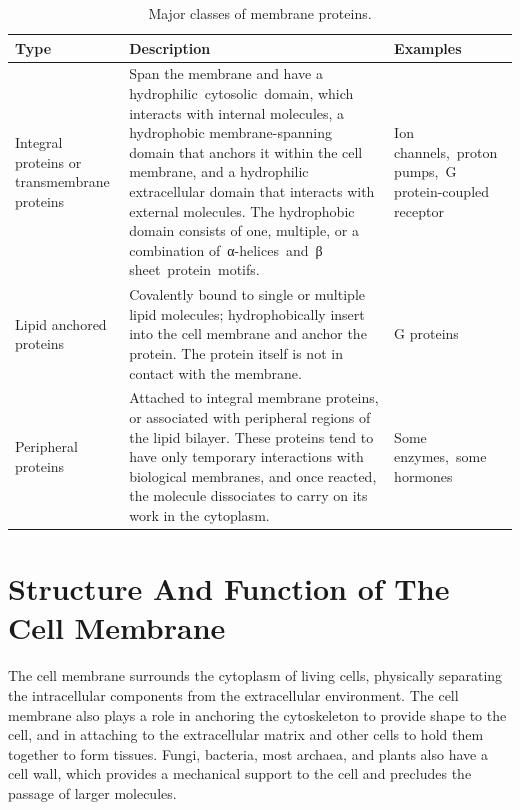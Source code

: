 \onecolumn
\begin{table}
\caption{\label{tab:membraneproteins}Major classes of membrane proteins.}
\centering
\begin{tabular}[t]{>{\raggedright\arraybackslash}p{10em}>{\raggedright\arraybackslash}p{25em}>{\raggedright\arraybackslash}p{25em}}
\toprule
Type & Description & Examples\\
\midrule
\rowcolor{gray!6}  Integral proteins or transmembrane proteins & Span the membrane and have a hydrophilic cytosolic domain, which interacts with internal molecules, a hydrophobic membrane-spanning domain that anchors it within the cell membrane, and a hydrophilic extracellular domain that interacts with external molecules. The hydrophobic domain consists of one, multiple, or a combination of α-helices and β sheet protein motifs. & Ion channels, proton pumps, G protein-coupled receptor\\
Lipid anchored proteins & Covalently bound to single or multiple lipid molecules; hydrophobically insert into the cell membrane and anchor the protein. The protein itself is not in contact with the membrane. & G proteins\\
\rowcolor{gray!6}  Peripheral proteins & Attached to integral membrane proteins, or associated with peripheral regions of the lipid bilayer. These proteins tend to have only temporary interactions with biological membranes, and once reacted, the molecule dissociates to carry on its work in the cytoplasm. & Some enzymes, some hormones\\
\bottomrule
\end{tabular}
\end{table}

\twocolumn

\hypertarget{structure-and-function-of-the-cell-membrane}{%
\section{Structure And Function of The Cell Membrane}\label{structure-and-function-of-the-cell-membrane}}

The cell membrane surrounds the cytoplasm of living cells, physically separating the intracellular components from the extracellular environment. The cell membrane also plays a role in anchoring the cytoskeleton to provide shape to the cell, and in attaching to the extracellular matrix and other cells to hold them together to form tissues. Fungi, bacteria, most archaea, and plants also have a cell wall, which provides a mechanical support to the cell and precludes the passage of larger molecules.

